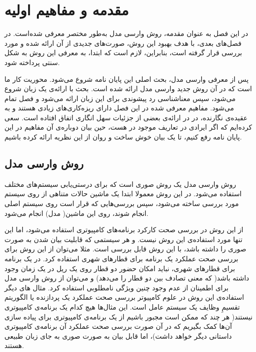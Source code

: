 \pagestyle{plain}
\setcounter{page}{1}

\chapter{مقدمه و مفاهیم اولیه}

در این فصل به عنوان مقدمه، روش وارسی مدل به‌طور مختصر معرفی شده‌است. در فصل‌های بعدی، با هدف بهبود این روش، صورت‌های جدیدی از آن ارائه شده و مورد بررسی قرار گرفته است، بنابراین، لازم است که ابتدا، به معرفی این روش به شکل سنتی پرداخته شود.

پس از معرفی وارسی مدل، بحث اصلی این پایان نامه شروع می‌شود. محوریت کار ما\cite{calcul} است که در آن روش جدید وارسی مدل ارائه شده است. بحث با ارائه‌ی یک زبان شروع می‌شود، سپس معناشناسی رد پیشوندی برای این زبان ارائه می‌شود و فصل تمام می‌شود. مفاهیم معرفی شده در این فصل دارای ریزه‌کاری‌های زیادی هستند و به عقیده‌ی نگارنده، در \cite{calcul} در ارائه‌ی بعضی از جزئیات سهل انگاری اتفاق افتاده است. سعی کرده‌ایم که اگر ایرادی در تعاریف موجود در \cite{calcul} هست، حین بیان دوباره‌ی آن مفاهیم در این پایان نامه رفع کنیم، تا یک بیان خوش ساخت و روان از این نظریه ارائه کرده باشیم.


\section{روش وارسی مدل}

روش وارسی مدل یک روش صوری است که برای درستی‌یابی سیستم‌های مختلف استفاده می‌شود. در این روش معمولا ابتدا یک ماشین حالات متناهی از روی سیستم مورد بررسی ساخته می‌شود، سپس بررسی‌هایی که قرار است روی سیستم اصلی انجام شوند، روی این ماشین( مدل) انجام می‌شود. 

از این روش در بررسی صحت کارکرد برنامه‌های کامپیوتری استفاده می‌شود، اما این تنها مورد استفاده‌ی این روش نیست. و هر سیستمی که قابلیت بیان شدن به صورت صوری را داشته باشد، با این روش قابل بررسی است. مثلا می‌توان از این روش برای بررسی صحت عملکرد یک برنامه برای قطارهای شهری استفاده کرد. در یک برنامه‌ برای قطارهای شهری، نباید امکان حضور دو قطار روی یک ریل در یک زمان وجود داشته باشد( که معنی تصادف بین دو قطار را می‌دهد) و می‌توان از روش وارسی مدل برای اطمینان از عدم وجود چنین ویژگی نامطلوبی استفاده کرد. مثال های دیگر استفاده‌ی این روش در علوم کامپیوتر بررسی صحت عملکرد یک پردازنده یا الگوریتم تقسیمِ وظایف یک سیستم عامل است. این مثال‌ها هیچ کدام یک برنامه‌ی کامپیوتری نیستند( هر چند که ممکن است مجبور باشیم از یک برنامه‌ی کامپیوتری برای پیاده سازی آن‌ها کمک بگیریم که در آن صورت بررسی صحت عملکرد آن برنامه‌ی کامپیوتری داستانی دیگر خواهد داشت)، اما قابل بیان به صورت صوری به جای زبان طبیعی هستند.


